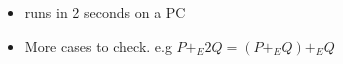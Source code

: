 \documentclass[10pt,final]{beamer} %
\theoremstyle{definition}
\begin{document}
\begin{frame}
\begin{scriptsize}
\begin{itemize}[<+-| alert@+>]
 \item runs in 2 seconds on a PC
\item More cases to check. e.g  \alert{$P+_E2Q=(P+_EQ)+_EQ$}
\end{itemize}
\end{scriptsize}
\end{frame}
\end{document}
